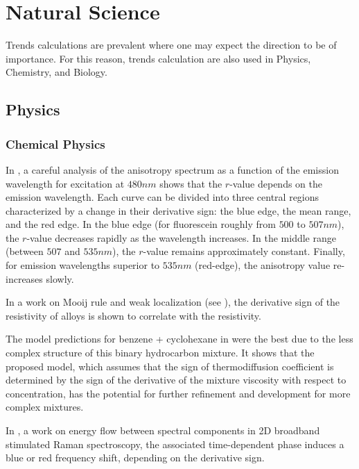 \documentclass[11pt]{book}
\begin{document}

\section{Natural Science}

Trends calculations are prevalent where one may expect the direction
to be of importance. For this reason, trends calculation are also used in Physics, Chemistry, and Biology.


\subsection{Physics}


\subsubsection{Chemical Physics}

\label{chemical_physics_subsubsection}

In \cite{martini2010gold}, a careful analysis of the anisotropy spectrum
as a function of the emission wavelength for excitation at $480nm$
shows that the $r$-value depends on the emission wavelength. Each
curve can be divided into three central regions characterized by a
change in their derivative sign: the blue edge, the mean range, and
the red edge. In the blue edge (for fluorescein roughly from $500$
to $507nm$), the $r$-value decreases rapidly as the wavelength increases.
In the middle range (between $507$ and $535nm$), the $r$-value
remains approximately constant. Finally, for emission wavelengths
superior to $535nm$ (red-edge), the anisotropy value re-increases
slowly.

In a work on Mooij rule and weak localization (see \cite{gantmakher2011mooij}), the derivative sign of the resistivity of alloys is shown to correlate
with the resistivity. 

The model predictions for benzene + cyclohexane in \cite{eslamian2012thermodiffusion}
were the best due to the less complex structure of this binary hydrocarbon
mixture. It shows that the proposed model, which assumes that the
sign of thermodiffusion coefficient is determined by the sign of the
derivative of the mixture viscosity with respect to concentration,
has the potential for further refinement and development for more
complex mixtures.

In \cite{batignani2015energy}, a work on energy flow between spectral components in 2D broadband stimulated
Raman spectroscopy, the associated time-dependent phase
induces a blue or red frequency shift, depending on the derivative
sign.
\end{document}
